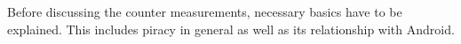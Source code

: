 Before discussing the counter measurements, necessary basics have to be explained. This includes piracy in general as well as its relationship with Android. 

